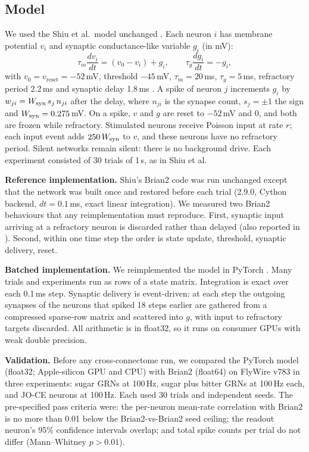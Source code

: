 \subsection*{Model}
We used the Shiu et al.\ model unchanged \citep{shiu2024}. Each neuron $i$ has membrane
potential $v_i$ and synaptic conductance-like variable $g_i$ (in mV):
\begin{equation}
\tau_m \frac{dv_i}{dt} = (v_0 - v_i) + g_i, \qquad \tau_g \frac{dg_i}{dt} = -g_i ,
\end{equation}
with $v_0=v_{\mathrm{reset}}=-52$\,mV, threshold $-45$\,mV, $\tau_m=20$\,ms, $\tau_g=5$\,ms,
refractory period 2.2\,ms and synaptic delay 1.8\,ms \citep{kakaria2017,shiu2024}. A spike of
neuron $j$ increments $g_i$ by $w_{ji}=W_{\mathrm{syn}}\, s_j\, n_{ji}$ after the delay, where $n_{ji}$
is the synapse count, $s_j=\pm1$ the sign and $W_{\mathrm{syn}}=0.275$\,mV. On a spike, $v$ and $g$ are
reset to $-52$\,mV and 0, and both are frozen while refractory. Stimulated neurons receive
Poisson input at rate $r$; each input event adds $250\,W_{\mathrm{syn}}$ to $v$, and these neurons have
no refractory period. Silent networks remain silent: there is no background drive. Each
experiment consisted of 30 trials of 1\,s, as in Shiu et al.

\textbf{Reference implementation.} Shiu's Brian2 \citep{stimberg2019} code was run unchanged
except that the network was built once and restored before each trial (2.9.0, Cython
backend, $dt=0.1$\,ms, exact linear integration). We measured two Brian2 behaviours that
any reimplementation must reproduce. First, synaptic input arriving at a refractory neuron is
discarded rather than delayed (also reported in \citep{santos2026}). Second, within one time
step the order is state update, threshold, synaptic delivery, reset.

\textbf{Batched implementation.} We reimplemented the model in PyTorch \citep{paszke2019}.
Many trials and experiments run as rows of a state matrix. Integration is exact over each
0.1\,ms step. Synaptic delivery is event-driven: at each step the outgoing synapses of the
neurons that spiked 18 steps earlier are gathered from a compressed sparse-row matrix and
scattered into $g$, with input to refractory targets discarded. All arithmetic is in float32,
so it runs on consumer GPUs with weak double precision.

\textbf{Validation.} Before any cross-connectome run, we compared the PyTorch model (float32;
Apple-silicon GPU and CPU) with Brian2 (float64) on FlyWire v783 in three experiments: sugar
GRNs at 100\,Hz, sugar plus bitter GRNs at 100\,Hz each, and JO-CE neurons at 100\,Hz. Each
used 30 trials and independent seeds. The pre-specified pass criteria were: the per-neuron
mean-rate correlation with Brian2 is no more than 0.01 below the Brian2-vs-Brian2 seed
ceiling; the readout neuron's 95\% confidence intervals overlap; and total spike counts per
trial do not differ (Mann--Whitney $p>0.01$).

